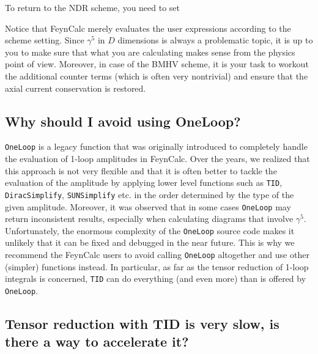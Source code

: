\documentclass[../FeynCalcManual.tex]{subfiles}
\begin{document}
To return to the NDR scheme, you need to set

\begin{Shaded}
\begin{Highlighting}[]
\ExtensionTok{=}
\end{Highlighting}
\end{Shaded}

Notice that FeynCalc merely evaluates the user expressions according to
the scheme setting. Since \(\gamma^5\) in \(D\) dimensions is always a
problematic topic, it is up to you to make sure that what you are
calculating makes sense from the physics point of view. Moreover, in
case of the BMHV scheme, it is your task to workout the additional
counter terms (which is often very nontrivial) and ensure that the axial
current conservation is restored.

\hypertarget{why-should-i-avoid-using-oneloop}{%
\subsection{Why should I avoid using
OneLoop?}\label{why-should-i-avoid-using-oneloop}}

\texttt{OneLoop} is a legacy function that was originally introduced to
completely handle the evaluation of 1-loop amplitudes in FeynCalc. Over
the years, we realized that this approach is not very flexible and that
it is often better to tackle the evaluation of the amplitude by applying
lower level functions such as \texttt{TID}, \texttt{DiracSimplify},
\texttt{SUNSimplify} etc. in the order determined by the type of the
given amplitude. Moreover, it was observed that in some cases
\texttt{OneLoop} may return inconsistent results, especially when
calculating diagrams that involve \(\gamma^5\). Unfortunately, the
enormous complexity of the \texttt{OneLoop} source code makes it
unlikely that it can be fixed and debugged in the near future. This is
why we recommend the FeynCalc users to avoid calling \texttt{OneLoop}
altogether and use other (simpler) functions instead. In particular, as
far as the tensor reduction of 1-loop integrals is concerned,
\texttt{TID} can do everything (and even more) than is offered by
\texttt{OneLoop}.

\hypertarget{tensor-reduction-with-tid-is-very-slow-is-there-a-way-to-accelerate-it}{%
\subsection{Tensor reduction with TID is very slow, is there a way to
accelerate
it?}\label{tensor-reduction-with-tid-is-very-slow-is-there-a-way-to-accelerate-it}}
\end{document}
